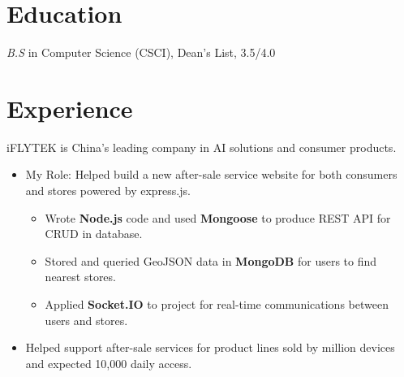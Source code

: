 \documentclass{resume}
\begin{document}



\section{Education}
\textit{B.S} in Computer Science (CSCI), Dean's List, 3.5/4.0

\section{Experience}
  iFLYTEK is China's leading company in AI solutions and consumer products.
\begin{itemize}
  \item My Role: Helped build a new after-sale service website for both consumers and stores powered by express.js.
  \begin{itemize}
    \item Wrote \textbf{Node.js} code and used \textbf{Mongoose} to produce REST API for CRUD in database.
    \item Stored and queried GeoJSON data in \textbf{MongoDB} for users to find nearest stores.
    \item Applied \textbf{Socket.IO} to project for real-time communications between users and stores.
  \end{itemize}
  \item Helped support after-sale services for product lines sold by million devices and expected 10,000 daily access.
\end{itemize}
\end{document}
